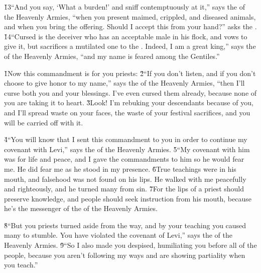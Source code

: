 \v{13}``And you say, `What a burden!' and sniff contemptuously at it,'' says the  of the Heavenly Armies, ``when you present maimed, crippled, and diseased animals, and when you bring the offering. Should I accept this from your hand?'' asks the . \v{14}``Cursed is the deceiver who has an acceptable male in his flock, and vows to give it, but sacrifices a mutilated one to the . Indeed, I am a great king,'' says the  of the Heavenly Armies, ``and my name is feared among the Gentiles.''

\v{1}Now this commandment is for you priests: \v{2}``If you don't listen, and if you don't choose to give honor to my name,'' says the  of the Heavenly Armies, ``then I'll curse both you and your blessings. I've even cursed them already, because none of you are taking it to heart. \v{3}Look! I'm rebuking your descendants because of you, and I'll spread waste on your faces, the waste of your festival sacrifices, and you will be carried off with it.

\v{4}``You will know that I sent this commandment to you in order to continue my covenant with Levi,'' says the  of the Heavenly Armies. \v{5}``My covenant with him was for life and peace, and I gave the commandments to him so he would fear me. He did fear me as he stood in my presence. \v{6}True teachings were in his mouth, and falsehood was not found on his lips. He walked with me peacefully and righteously, and he turned many from sin. \v{7}For the lips of a priest should preserve knowledge, and people should seek instruction from his mouth, because he's the messenger of the  of the Heavenly Armies.

\v{8}``But you priests turned aside from the way, and by your teaching you caused many to stumble. You have violated the covenant of Levi,'' says the  of the Heavenly Armies. \v{9}``So I also made you despised, humiliating you before all of the people, because you aren't following my ways and are showing partiality when you teach.''

